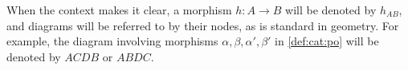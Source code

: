 \begin{notation}
    When the context makes it clear, a morphism \( h : A \to B \) will be denoted by \( h_{AB} \), and diagrams will be referred to by their nodes, as is standard in geometry. For example, the diagram involving morphisms \( \alpha, \beta, \alpha', \beta' \) in \autoref{def:cat:po} will be denoted by \( ACDB \) or \( ABDC \).
\end{notation}   